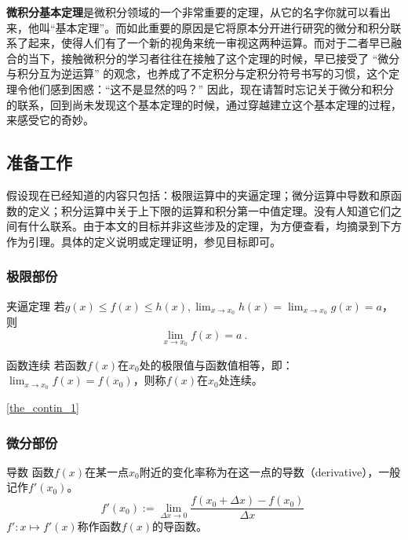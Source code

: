 
\begin{issues}
\issueTODO
\issueMissDepend
\issueNeedCite
\issueDraft
\end{issues}

\textbf{微积分基本定理}是微积分领域的一个非常重要的定理，从它的名字你就可以看出来，他叫“基本定理”。而如此重要的原因是它将原本分开进行研究的微分和积分联系了起来，使得人们有了一个新的视角来统一审视这两种运算。而对于二者早已融合的当下，接触微积分的学习者往往在接触了这个定理的时候，早已接受了 “微分与积分互为逆运算” 的观念，也养成了不定积分与定积分符号书写的习惯，这个定理令他们感到困惑：“这不是显然的吗？”
因此，现在请暂时忘记关于微分和积分的联系，回到尚未发现这个基本定理的时候，通过穿越建立这个基本定理的过程，来感受它的奇妙。

\subsection{准备工作}

假设现在已经知道的内容只包括：极限运算中的夹逼定理；微分运算中导数和原函数的定义；积分运算中关于上下限的运算和积分第一中值定理。没有人知道它们之间有什么联系。由于本文的目标并非这些涉及的定理，为方便查看，均摘录到下方作为引理。具体的定义说明或定理证明，参见目标即可。

\subsubsection{极限部份}
\begin{lemma}{夹逼定理}\label{lem_FTcalc_3}
若$g(x)\leq f(x)\leq h(x),\lim _{x\to x_0}h(x)=\lim _{x\to x_0}g(x)=a$，则
$$\lim _{x\to x_0}f(x)=a~.$$
\end{lemma}

\begin{definition}{函数连续}\label{def_FTcalc_1}
若函数$f(x)$在$x_0$处的极限值与函数值相等，即：$\lim_{x\to x_0}f(x)=f(x_0)$，则称$f(x)$在$x_0$处连续。
\end{definition}
\autoref{the_contin_1}~
\subsubsection{微分部份}
\begin{definition}{导数}\label{def_FTcalc_2}
函数$f(x)$在某一点$x_0$附近的变化率称为在这一点的导数（derivative），一般记作$f'(x_0)$。
$$f'(x_0):=\lim_{\Delta x\to0}{\frac{f(x_0+\Delta x)-f(x_0)}{\Delta x}}~$$
$f':x\mapsto f'(x)$称作函数$f(x)$的导函数。
\end{definition}

